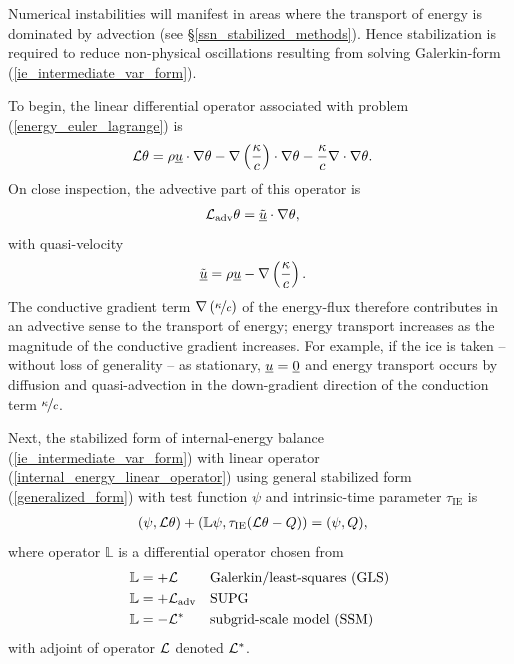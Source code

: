 Numerical instabilities will manifest in areas where the transport of energy is dominated by advection (see \S \ref{ssn_stabilized_methods}).  Hence stabilization is required to reduce non-physical oscillations resulting from solving Galerkin-form (\ref{ie_intermediate_var_form}).

To begin, the linear differential operator associated with problem (\ref{energy_euler_lagrange}) is
\begin{align}
  \label{internal_energy_linear_operator}
  \mathcal{L} \theta &= \rho \underline{u} \cdot \nabla \theta - \nabla \left( \frac{\kappa}{c} \right) \cdot \nabla \theta - \frac{\kappa}{c} \nabla \cdot \nabla \theta.
\end{align}
On close inspection, the advective part of this operator is
\begin{align}
  \label{internal_energy_advective_operator}
  \mathcal{L}_{\text{adv}} \theta &= \tilde{\underline{u}} \cdot \nabla \theta,
\end{align}
with quasi-velocity
\begin{align}
  \label{internal_energy_quasi_velocity}
  \tilde{\underline{u}} &= \rho \underline{u} - \nabla \left( \frac{\kappa}{c} \right).
\end{align}
The conductive gradient term $\nabla \left( \nicefrac{\kappa}{c} \right)$ of the energy-flux therefore contributes in an advective sense to the transport of energy; energy transport increases as the magnitude of the conductive gradient increases.  For example, if the ice is taken -- without loss of generality -- as stationary, $\underline{u} = \underline{0}$ and energy transport occurs by diffusion and quasi-advection in the down-gradient direction of the conduction term $\nicefrac{\kappa}{c}$.

Next, the stabilized form of internal-energy balance (\ref{ie_intermediate_var_form}) with linear operator (\ref{internal_energy_linear_operator}) using general stabilized form (\ref{generalized_form}) with test function $\psi$ and intrinsic-time parameter $\tau_{\text{IE}}$ is 
\begin{align}
  \label{internal_energy_generalized_form}
  (\psi, \mathcal{L} \theta) + (\mathbb{L} \psi, \tau_{\text{IE}}(\mathcal{L}\theta - Q)) &= (\psi, Q),
\end{align}
where operator $\mathbb{L}$ is a differential operator chosen from 
\begin{align}
  \label{ie_gls_operator}
  \mathbb{L} &= + \mathcal{L} && \text{Galerkin/least-squares (GLS)} \\
  \label{ie_supg_operator}
  \mathbb{L} &= + \mathcal{L}_{\text{adv}} && \text{SUPG} \\
  \label{ie_ssm_operator}
  \mathbb{L} &= - \mathcal{L}^* && \text{subgrid-scale model (SSM)}
\end{align}
with adjoint of operator $\mathcal{L}$ denoted $\mathcal{L}^*$.

